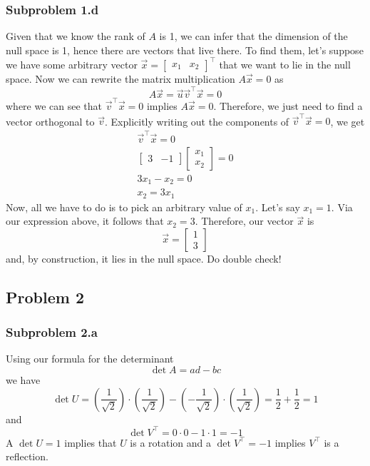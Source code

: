 \documentclass[11pt]{article}
\begin{document}
\subsubsection*{Subproblem 1.d}
Given that we know the rank of $A$ is 1, we can infer that the dimension of the null space is 1, hence there are vectors that live there. To find them, let's suppose we have some arbitrary vector $\vec{x}=\begin{bmatrix}
    x_1 & x_2
\end{bmatrix}^\top$ that we want to lie in the null space. Now we can rewrite the matrix multiplication $A\vec{x}=0$ as 
\[
A\vec{x}=\vec{u}\vec{v}^\top\vec{x}=0
\]
where we can see that $\vec{v}^\top\vec{x}=0$ implies $A\vec{x}=0$. Therefore, we just need to find a vector orthogonal to $\vec{v}$. Explicitly writing out the components of $\vec{v}^\top\vec{x}=0$, we get
\begin{gather*}
    \vec{v}^\top\vec{x}=0\\
    \begin{bmatrix}
    3 & -1
\end{bmatrix}\begin{bmatrix}
    x_1 \\ x_2
\end{bmatrix}=0\\
3x_1-x_2 = 0\\
x_2=3x_1
\end{gather*}
Now, all we have to do is to pick an arbitrary value of $x_1$. Let's say $x_1=1$. Via our expression above, it follows that $x_2=3$. Therefore, our vector $\vec{x}$ is 
\[
\vec{x}=\begin{bmatrix}
    1 \\ 3
\end{bmatrix}
\]
and, by construction, it lies in the null space. Do double check!

\subsection*{Problem 2}
\subsubsection*{Subproblem 2.a}
Using our formula for the determinant
\[
\det A = ad - bc
\]
we have 
\[
\det U = \left(\frac{1}{\sqrt{2}}\right)\cdot  \left(\frac{1}{\sqrt{2}}\right)-  \left(-\frac{1}{\sqrt{2}}\right)\cdot \left(\frac{1}{\sqrt{2}}\right)=\frac{1}{2}+\frac{1}{2}=1
\]
and 
\[
\det V^\top = 0\cdot 0 - 1\cdot 1 = -1
\]
A $\det U =1$ implies that $U$ is a rotation and a $\det V^\top=-1$ implies $V^\top$ is a reflection.
\end{document}
